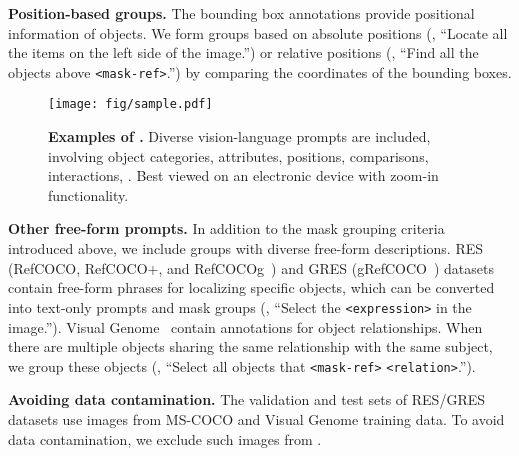 \noindent\textbf{Position-based groups.} The bounding box annotations provide positional information of objects. We form groups based on absolute positions (\eg, ``Locate all the items on the left side of the image.'') or relative positions (\eg, ``Find all the objects above \texttt{\textless mask-ref\textgreater}.'') by comparing the coordinates of the bounding boxes.

\begin{figure}[th]
    \centering
    \texttt{[image: fig/sample.pdf]}
    \caption{\textbf{Examples of \ourgooddata.} Diverse vision-language prompts are included, involving object categories, attributes, positions, comparisons, interactions, \etc. Best viewed on an electronic device with zoom-in functionality.}
    \vspace{-4mm}
    \label{fig:sample}
\end{figure}

\noindent\textbf{Other free-form prompts.} In addition to the mask grouping criteria introduced above, we include groups with diverse free-form descriptions. RES (RefCOCO, RefCOCO+, and RefCOCOg~\cite{yu2016modeling}) and GRES (gRefCOCO~\cite{liu2023gres}) datasets contain free-form phrases for localizing specific objects, which can be converted into text-only prompts and mask groups (\eg, ``Select the \texttt{\textless expression\textgreater} in the image.''). Visual Genome~\cite{krishna2017visual} contain annotations for object relationships. When there are multiple objects sharing the same relationship with the same subject, we group these objects (\eg, ``Select all objects that \texttt{\textless mask-ref\textgreater} \texttt{\textless relation\textgreater}.'').

\noindent\textbf{Avoiding data contamination.} The validation and test sets of RES/GRES datasets use images from MS-COCO and Visual Genome training data. To avoid data contamination, we exclude such images from \ourlargedata.

